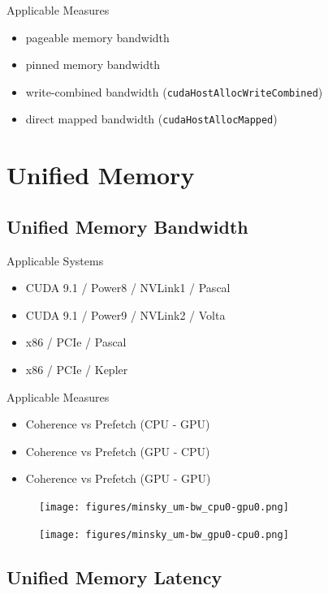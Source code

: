 Applicable Measures
\begin{itemize}
    \item pageable memory bandwidth
    \item pinned memory bandwidth
    \item write-combined bandwidth (\texttt{cudaHostAllocWriteCombined})
    \item direct mapped bandwidth  (\texttt{cudaHostAllocMapped})
\end{itemize}

\section{Unified Memory}



\subsection{Unified Memory Bandwidth}

Applicable Systems
\begin{itemize}
    \item CUDA 9.1 / Power8 / NVLink1 / Pascal
    \item CUDA 9.1 / Power9 / NVLink2 / Volta
    \item x86 / PCIe / Pascal
    \item x86 / PCIe / Kepler
\end{itemize}

Applicable Measures
\begin{itemize}
    \item Coherence vs Prefetch (CPU - GPU)
    \item Coherence vs Prefetch (GPU - CPU)
    \item Coherence vs Prefetch (GPU - GPU)
\end{itemize}

\begin{figure}[ht]
    \centering
    \texttt{[image: figures/minsky\_um-bw\_cpu0-gpu0.png]}
    \caption[]{}
    \label{fig:}
\end{figure}

\begin{figure}[ht]
    \centering
    \texttt{[image: figures/minsky\_um-bw\_gpu0-cpu0.png]}
    \caption[]{}
    \label{fig:}
\end{figure}

\subsection{Unified Memory Latency}

